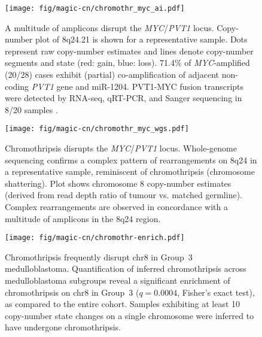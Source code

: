 \documentclass[11pt,letterpaper]{article}
\theoremstyle{definition}
\begin{document}
\clearpage

\begin{figure}[h]
	\begin{center}
		\texttt{[image: fig/magic-cn/chromothr\_myc\_ai.pdf]}
	\end{center}
	\caption[A multitude of amplicons disrupt the \emph{MYC}/\emph{PVT1} locus]
	{
	A multitude of amplicons disrupt the \emph{MYC}/\emph{PVT1} locus.
	Copy-number plot of 8q24.21 is shown for a representative sample. Dots represent raw copy-number estimates and lines denote copy-number segments and state (red: gain, blue: loss). 71.4\% of \emph{MYC}-amplified (20/28) cases exhibit (partial) co-amplification of adjacent non-coding \emph{PVT1} gene and miR-1204. PVT1-MYC fusion transcripts were detected by RNA-seq, qRT-PCR, and Sanger sequencing in 8/20 samples .
	}
	\label{fig:chromothr_myc}
\end{figure}

\begin{figure}[h]
	\begin{center}
		\texttt{[image: fig/magic-cn/chromothr\_myc\_wgs.pdf]}
	\end{center}
	\caption[Chromothripsis disrupts the \emph{MYC}/\emph{PVT1} locus.]
	{
	Chromothripsis disrupts the \emph{MYC}/\emph{PVT1} locus.
	Whole-genome sequencing confirms a complex pattern of rearrangements on 8q24 in a representative sample, reminiscent of chromothripsis (chromosome shattering).
	Plot shows chromosome 8 copy-number estimates (derived from read depth ratio of tumour vs. matched germline).
	Complex rearrangements are observed in concordance with a multitude of amplicons in the 8q24 region.
	}
	\label{fig:chromothr_myc_wgs}
\end{figure}

\begin{figure}[h]
	\begin{center}
		\texttt{[image: fig/magic-cn/chromothr-enrich.pdf]}
	\end{center}
	\caption[Chromothripsis frequently disrupt chr8 in Group~3 medulloblastoma]
	{
	Chromothripsis frequently disrupt chr8 in Group~3 medulloblastoma.
	Quantification of inferred chromothripsis across medulloblastoma subgroups reveal a significant enrichment of chromothripsis on chr8 in Group~3 ($q = 0.0004$, Fisher's exact test), as compared to the entire cohort. Samples exhibiting at least 10 copy-number state changes on a single chromosome were inferred to have undergone chromothripsis.
	}
	\label{fig:chromothr-enrich}
\end{figure}
\end{document}
